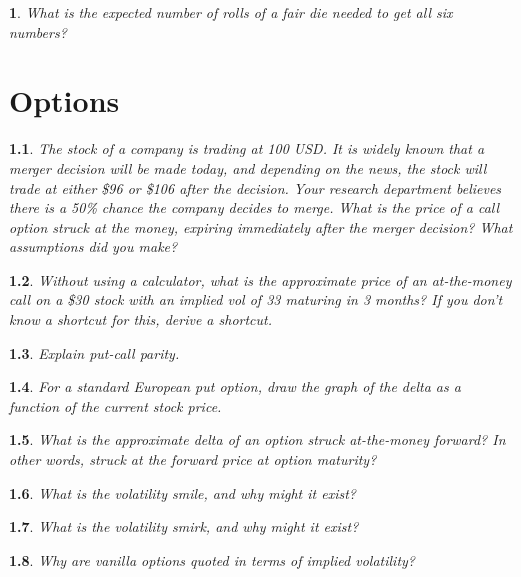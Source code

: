 \documentclass{report}
\newtheorem{problem}{}
\numberwithin{problem}{chapter} %
\begin{document}
\begin{problem}
What is the expected number of rolls of a fair die needed to get all six numbers?
\end{problem}

\chapter{Options}

\begin{problem}
The stock of a company is trading at 100 USD. It is widely known that a merger decision will be made today, and depending on the news, the stock will trade at either \$96 or \$106 after the decision. Your research department believes there is a 50\% chance
        the company decides to merge. What is the price of a call option struck at the money, expiring immediately after the merger decision? What assumptions did you make?
\end{problem}

\begin{problem}
Without using a calculator, what is the approximate price of an at-the-money call on a \$30 stock with an implied vol of 33 maturing in 3 months? If you don't know a shortcut for this, derive a shortcut.
\end{problem}

\begin{problem}
Explain put-call parity.
\end{problem}

\begin{problem}
\cite{CRACK} For a standard European put option, draw the graph of the delta as a function of the current stock price.
\end{problem}

\begin{problem}
What is the approximate delta of an option struck at-the-money forward? In other words, struck at the forward price at option maturity?
\end{problem}

\begin{problem}
What is the volatility smile, and why might it exist?
\end{problem}

\begin{problem}
What is the volatility smirk, and why might it exist?
\end{problem}

\begin{problem}
Why are vanilla options quoted in terms of implied volatility?
\end{problem}
\end{document}
